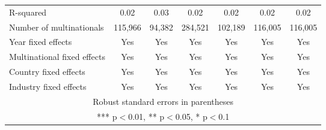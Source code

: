 \begin{tabular}{lcccccc}
R-squared & 0.02 & 0.03 & 0.02 & 0.02 & 0.02 & 0.02 \\
Number of multinationals & 115,966 & 94,382 & 284,521 & 102,189 & 116,005 & 116,005 \\
Year fixed effects & Yes & Yes & Yes & Yes & Yes & Yes \\
Multinational fixed effects & Yes & Yes & Yes & Yes & Yes & Yes \\
Country fixed effects & Yes & Yes & Yes & Yes & Yes & Yes \\
 Industry fixed effects & Yes & Yes & Yes & Yes & Yes & Yes \\ \hline
\multicolumn{7}{c}{ Robust standard errors in parentheses} \\
\multicolumn{7}{c}{ *** p$<$0.01, ** p$<$0.05, * p$<$0.1} \\
\end{tabular}
